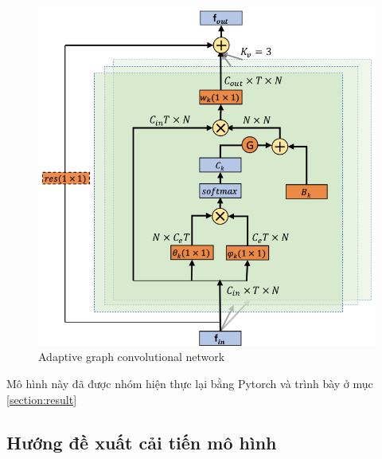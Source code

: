 \begin{figure}[!ht]
    \begin{center}
        \includegraphics[width=\linewidth]{asset/image/agcn.png}
        \caption{Adaptive graph convolutional network}
        \label{fig:agcn}
    \end{center}
\end{figure}

Mô hình này đã được nhóm hiện thực lại bằng Pytorch và trình bày ở mục \ref{section:result}

\subsection{Hướng đề xuất cải tiến mô hình}

